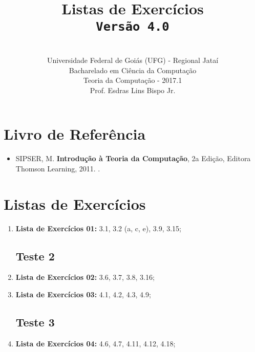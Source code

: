 \documentclass[12pt,a4paper,oneside]{article}
\author{\\Universidade Federal de Goiás (UFG) - Regional Jataí\\Bacharelado em Ciência da Computação \\Teoria da Computação - 2017.1 \\Prof. Esdras Lins Bispo Jr.}
\date{}
\title{
	\sc \huge Listas de Exercícios
	\\{\tt Versão 4.0}
}
\begin{document}
\maketitle

\section{Livro de Referência}
	\begin{itemize}
		\item SIPSER, M. {\bf Introdução à Teoria da Computação}, 2a Edição, Editora Thomson Learning, 2011. \color{blue}{\bf Código Bib.: [004 SIP/int]}.
	\end{itemize}
	
\section{Listas de Exercícios}

\begin{enumerate}

	\subsection{Teste 1}
	\item[] {\bf Lista de Exercícios 01:} 3.1, 3.2 (a, c, e), 3.9, 3.15;
	
	\subsection{Teste 2}
	
	\item[] {\bf Lista de Exercícios 02:} 3.6, 3.7, 3.8, 3.16;
	\item[] {\bf Lista de Exercícios 03:} 4.1, 4.2, 4.3, 4.9;
	
	\subsection{Teste 3}
		
	\item[] {\bf Lista de Exercícios 04:} 4.6, 4.7, 4.11, 4.12, 4.18;
	
\end{enumerate}
\end{document}
